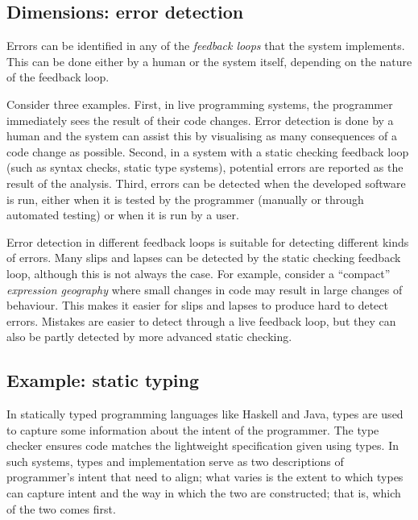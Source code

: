 \documentclass[ twoside,openright,titlepage,numbers=noenddot,headinclude,footinclude,cleardoublepage=empty,abstract=on,
                BCOR=5mm,paper=a4,fontsize=11pt
                ]{scrreprt}
\theoremstyle{definition}
\begin{document}
\hypertarget{dimensions-error-detection}{\subsection{Dimensions: error
detection}\label{dimensions-error-detection}}

Errors can be identified in any of the \emph{feedback loops} that the
system implements. This can be done either by a human or the system
itself, depending on the nature of the feedback loop.

Consider three examples. First, in live programming systems, the
programmer immediately sees the result of their code changes. Error
detection is done by a human and the system can assist this by
visualising as many consequences of a code change as possible. Second,
in a system with a static checking feedback loop (such as syntax checks,
static type systems), potential errors are reported as the result of the
analysis. Third, errors can be detected when the developed software is
run, either when it is tested by the programmer (manually or through
automated testing) or when it is run by a user.

Error detection in different feedback loops is suitable for detecting
different kinds of errors. Many slips and lapses can be detected by the
static checking feedback loop, although this is not always the case. For
example, consider a ``compact'' \emph{expression geography} where small
changes in code may result in large changes of behaviour. This makes it
easier for slips and lapses to produce hard to detect errors. Mistakes
are easier to detect through a live feedback loop, but they can also be
partly detected by more advanced static checking.

\hypertarget{example-static-typing}{\subsection{Example: static typing}\label{example-static-typing}}

In statically typed programming languages like Haskell and Java, types
are used to capture some information about the intent of the programmer.
The type checker ensures code matches the lightweight specification
given using types. In such systems, types and implementation serve as
two descriptions of programmer's intent that need to align; what varies
is the extent to which types can capture intent and the way in which the
two are constructed; that is, which of the two comes first.
\end{document}
